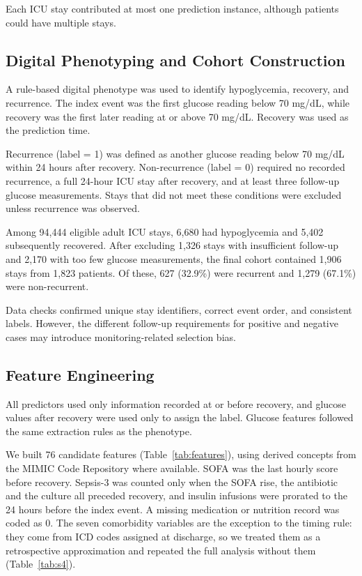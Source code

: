 \documentclass[twocolumn, 8pt]{article}
\begin{document}
Each ICU stay contributed at most one prediction instance, although patients could have multiple stays.

\subsection{Digital Phenotyping and Cohort Construction}
\label{sec:phenotype}

A rule-based digital phenotype was used to identify hypoglycemia, recovery, and recurrence. The index event was the first glucose reading below 70 mg/dL, while recovery was the first later reading at or above 70 mg/dL. Recovery was used as the prediction time.

Recurrence (label = 1) was defined as another glucose reading below 70 mg/dL within 24 hours after recovery. Non-recurrence (label = 0) required no recorded recurrence, a full 24-hour ICU stay after recovery, and at least three follow-up glucose measurements. Stays that did not meet these conditions were excluded unless recurrence was observed.

Among 94,444 eligible adult ICU stays, 6,680 had hypoglycemia and 5,402 subsequently recovered. After excluding 1,326 stays with insufficient follow-up and 2,170 with too few glucose measurements, the final cohort contained 1,906 stays from 1,823 patients. Of these, 627 (32.9\%) were recurrent and 1,279 (67.1\%) were non-recurrent.

Data checks confirmed unique stay identifiers, correct event order, and consistent labels. However, the different follow-up requirements for positive and negative cases may introduce monitoring-related selection bias.

\subsection{Feature Engineering}
\label{sec:features}

All predictors used only information recorded at or before recovery, and glucose values after recovery were used only to assign the label. Glucose features followed the same extraction rules as the phenotype.

We built 76 candidate features (Table~\ref{tab:features}), using derived concepts from the MIMIC Code Repository where available.\cite{johnson2018code} SOFA was the last hourly score before recovery. Sepsis-3\cite{singer2016sepsis3} was counted only when the SOFA rise, the antibiotic and the culture all preceded recovery, and insulin infusions were prorated to the 24 hours before the index event. A missing medication or nutrition record was coded as 0. The seven comorbidity variables are the exception to the timing rule: they come from ICD codes assigned at discharge, so we treated them as a retrospective approximation and repeated the full analysis without them (Table~\ref{tab:s4}).
\end{document}
